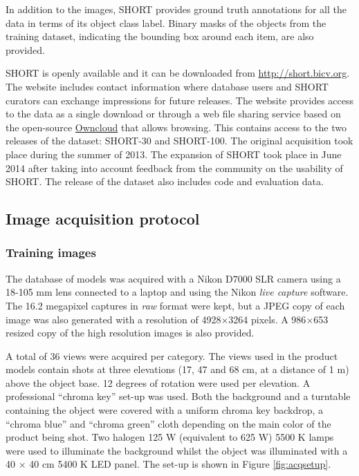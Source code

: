 In addition to the images, SHORT provides ground truth annotations for all the data in terms of its object class label. Binary masks of the objects from the training dataset, indicating the bounding box around each item, are also provided.

SHORT is openly available and it can be downloaded from \url{http://short.bicv.org}. The website  includes contact information where database users and SHORT curators can exchange impressions for future releases. The website provides access to the data as a single download or through a web file sharing service based on the open-source \href{https://www.owncloud.org}{Owncloud}
 that allows browsing. This contains access to the two releases of the dataset: SHORT-30 and SHORT-100. The original acquisition took place during the summer of 2013. The expansion of SHORT took place in June 2014 after taking into account feedback from the community on the usability of SHORT. The release of the dataset also includes code and evaluation data.

\subsection{Image acquisition protocol}

\subsubsection{Training images}

The database of models was acquired with a Nikon D7000 SLR camera using a 18-105 mm lens connected to a laptop and using the Nikon \textit{live capture} software. The 16.2 megapixel captures in \textit{raw} format were kept, but a JPEG copy of each image was also generated with a resolution of 4928$\times$3264 pixels. A 986$\times$653 resized copy of the high resolution images is also provided.

A total of 36 views were acquired per category. The views used in the product models contain shots at three elevations (17, 47 and 68 cm, at a distance of 1 m) above the object base. 12 degrees of rotation were used per elevation. A professional ``chroma key'' set-up was used. Both the background and a turntable containing the object were covered with a uniform chroma key backdrop, a ``chroma blue'' and ``chroma green'' cloth depending on the main color of the product being shot. Two halogen 125 W (equivalent to 625 W) 5500 K lamps were used to illuminate the background whilst the object was illuminated with a 40 $\times$ 40 cm 5400 K LED panel. The set-up is shown in Figure \ref{fig:acqsetup}.


